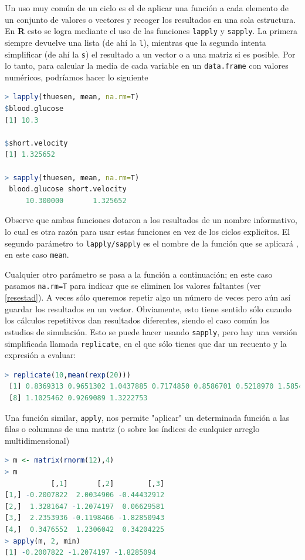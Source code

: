 \documentclass[spanish]{extbook}
\numberwithin{equation}{section}
\numberwithin{figure}{section}
\begin{document}
Un uso muy común de un ciclo es el de aplicar una función a cada elemento de un
conjunto de valores o vectores y recoger los resultados en una sola estructura.
En \textbf{R} esto se logra mediante el uso de las funciones \texttt{lapply} y
\texttt{sapply}. La primera siempre devuelve una lista (de ahí la \texttt{l}),
mientras que la segunda intenta simplificar (de ahí la \texttt{s}) el resultado
a un vector o a una matriz si es posible. Por lo tanto, para calcular la media
de cada variable en un \texttt{data.frame} con valores numéricos, podríamos hacer lo
siguiente

\begin{lstlisting}[language=R]
> lapply(thuesen, mean, na.rm=T)
$blood.glucose
[1] 10.3

$short.velocity
[1] 1.325652

> sapply(thuesen, mean, na.rm=T)
 blood.glucose short.velocity 
     10.300000       1.325652 
\end{lstlisting}

Observe que ambas funciones dotaron a los resultados de un nombre informativo,
lo cual es otra razón para usar estas funciones en vez de los ciclos
explicítos. El segundo parámetro to \texttt{lapply/sapply} es el nombre de la
función que se aplicará , en este caso \texttt{mean}. 

Cualquier otro parámetro se pasa a la función a continuación; en este caso
pasamos \texttt{na.rm=T} para indicar que se eliminen los valores faltantes
(ver \ref{resestad}).  A veces sólo queremos repetir algo un número de veces
pero aún así guardar los resultados en un vector. Obviamente, esto tiene
sentido sólo cuando los cálculos repetitivos dan resultados diferentes, siendo
el caso común los estudios de simulación. Esto se puede hacer usando
\texttt{sapply}, pero hay una versión simplificada llamada \texttt{replicate},
en el que sólo tienes que dar un recuento y la expresión a evaluar:

\begin{lstlisting}[language=R]
> replicate(10,mean(rexp(20)))
 [1] 0.8369313 0.9651302 1.0437885 0.7174850 0.8586701 0.5218970 1.5854871
 [8] 1.1025462 0.9269089 1.3222753
\end{lstlisting}

Una función similar, \texttt{apply}, nos permite "aplicar" un determinada
función a las filas o columnas de una matriz (o sobre los índices de cualquier
arreglo multidimensional)

\begin{lstlisting}[language=R]
> m <- matrix(rnorm(12),4)
> m
           [,1]       [,2]        [,3]
[1,] -0.2007822  2.0034906 -0.44432912
[2,]  1.3281647 -1.2074197  0.06629581
[3,]  2.2353936 -0.1198466 -1.82850943
[4,]  0.3476552  1.2306042  0.34204225
> apply(m, 2, min)
[1] -0.2007822 -1.2074197 -1.8285094
\end{lstlisting}
\end{document}
